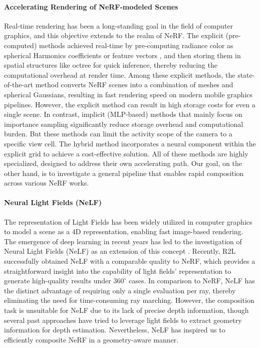 \documentclass[letterpaper]{article}
\begin{document}
\paragraph{Accelerating Rendering of NeRF-modeled Scenes}
Real-time rendering has been a long-standing goal in the field of computer graphics, and this objective extends to the realm of NeRF. The explicit (pre-computed) methods achieved real-time by pre-computing radiance color as spherical Harmonics coefficients \cite{yu2021plenoctrees} or feature vectors \cite{hedman2021baking,chen2022mobilenerf}, and then storing them in spatial structures like octree for quick inference, thereby reducing the computational overhead at render time. Among these explicit methods, the state-of-the-art method \cite{bakedsdf2023sig} converts NeRF scenes into a combination of meshes and spherical Gaussians, resulting in fast rendering speed on modern mobile graphics pipelines. However, the explicit method can result in high storage costs for even a single scene. In contrast, implicit (MLP-based) methods that mainly focus on importance sampling \cite{piala2021terminerf, neff2021donerf, kurz2022adanerf, Niemeyer2021Regnerf} significantly reduce storage overhead and computational burden. But these methods can limit the activity scope of the camera to a specific view cell. The hybrid method \cite{liu2020neural} incorporates a neural component within the explicit grid to achieve a cost-effective solution. All of these methods are highly specialized, designed to address their own accelerating path. Our goal, on the other hand, is to investigate a general pipeline that enables rapid composition across various NeRF works.

\paragraph{Neural Light Fields (NeLF)}
The representation of Light Fields has been widely utilized in computer graphics to model a scene as a 4D representation, enabling fast image-based rendering. The emergence of deep learning in recent years has led to the investigation of Neural Light Fields (NeLF) as an extension of this concept
\cite{meng2019high,wizadwongsa2021nex,attal2022learning,sitzmann2021light,suhail2022light}. Recently, R2L \cite{cao2022real, wang2022r2l} successfully obtained NeLF with a comparable quality to NeRF, which provides a straightforward insight into the capability of light fields' representation to generate high-quality results under $360^{\circ}$ cases. In comparison to NeRF, NeLF has the distinct advantage of requiring only a single evaluation per ray, thereby eliminating the need for time-consuming ray marching. However, the composition task is unsuitable for NeLF due to its lack of precise depth information, though several past approaches \cite{1328805, 6910019, Kim2013scene} have tried to leverage light fields to extract geometry information for depth estimation. Nevertheless, NeLF has inspired us to efficiently composite NeRF in a geometry-aware manner.
\end{document}
